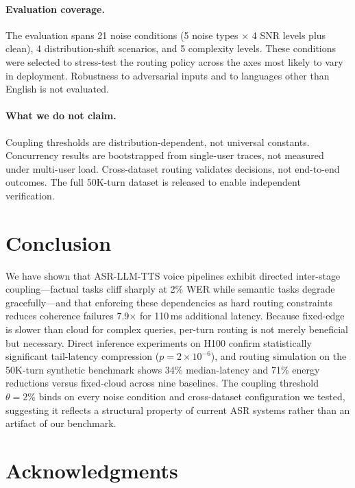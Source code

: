 \documentclass{article}
\begin{document}
\paragraph{Evaluation coverage.}
The evaluation spans 21 noise conditions (5 noise types $\times$ 4 SNR levels plus clean), 4 distribution-shift scenarios, and 5 complexity levels. These conditions were selected to stress-test the routing policy across the axes most likely to vary in deployment. Robustness to adversarial inputs and to languages other than English is not evaluated.

\paragraph{What we do not claim.}
Coupling thresholds are distribution-dependent, not universal constants. Concurrency results are bootstrapped from single-user traces, not measured under multi-user load. Cross-dataset routing validates decisions, not end-to-end outcomes. The full 50K-turn dataset is released to enable independent verification.

\section{Conclusion}
\label{sec:conclusion}

We have shown that ASR-LLM-TTS voice pipelines exhibit directed inter-stage coupling---factual tasks cliff sharply at 2\% WER while semantic tasks degrade gracefully---and that enforcing these dependencies as hard routing constraints reduces coherence failures 7.9$\times$ for 110\,ms additional latency. Because fixed-edge is slower than cloud for complex queries, per-turn routing is not merely beneficial but necessary. Direct inference experiments on H100 confirm statistically significant tail-latency compression ($p = 2\times10^{-6}$), and routing simulation on the 50K-turn synthetic benchmark shows 34\% median-latency and 71\% energy reductions versus fixed-cloud across nine baselines. The coupling threshold $\theta=2\%$ binds on every noise condition and cross-dataset configuration we tested, suggesting it reflects a structural property of current ASR systems rather than an artifact of our benchmark.

\section*{Acknowledgments}
\end{document}
